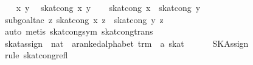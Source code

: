 \begin{isabellebody}
\ \ \isamarkupfalse%
\ x\ y\ \isamarkupfalse%
\ {}skat{}cong\ x\ y{}\isanewline
\ \ \isamarkupfalse%
\ {}skat{}cong\ x\ {}\ skat{}cong\ y{}\isanewline
\ \ \ \ \isamarkupfalse%
\ {}subgoal{}tac\ {}{}z{}\ skat{}cong\ x\ z\ {}\ skat{}cong\ y\ z{}{}\isanewline
\ \ \ \ \isamarkupfalse%
\ auto\ {}metis\ skat{}cong{}sym\ skat{}cong{}trans{}{}\isanewline
{}\isamarkupfalse%
%
\endisatagproof
{\isafoldproof}%
%
\isadelimproof
%
\endisadelimproof
%
\isamarkuptrue%
\isamarkupfalse%
\ skat{}assign\ {}{}\ {}nat\ {}\ {}a{}{}ranked{}alphabet\ trm\ {}\ {}a\ skat{}\isanewline
\ \ {}\ {}{}{}{}\ {}{}{}{}\ \ SKAssign\isanewline
%
\isadelimproof
\ \ %
\endisadelimproof
%
\isatagproof
{}\isamarkupfalse%
\ {}rule\ skat{}cong{}refl{}%

\end{isabellebody}
